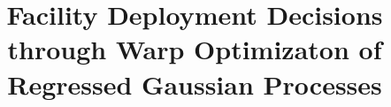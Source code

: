 \documentclass{ntmanuscript}
\title{Facility Deployment Decisions through Warp Optimizaton 
       of Regressed Gaussian Processes}
\date{}
\begin{document}
\begin{abstract}

\end{abstract}


%
%

%



\end{document}
